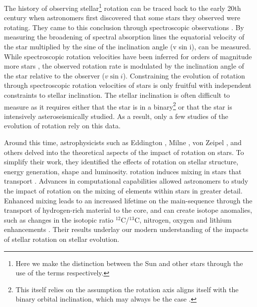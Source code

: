 The history of observing stellar\footnote{Here we make the distinction between the Sun and other stars through the use of the terms  respectively.} rotation can be traced back to the early 20th century when astronomers first discovered that some stars they observed were rotating. 
They came to this conclusion through spectroscopic observations \citep{elvey_contours_1929, struve_stellar_1930, struve_axial_1930}.
By measuring the broadening of spectral absorption lines the equatorial velocity of the star multiplied by the sine of the inclination angle (v sin i), can be measured.
While spectroscopic rotation velocities have been inferred for orders of magnitude more stars , the observed rotation rate is modulated by the  inclination angle of the star relative to the observer ($v\sin{i}$).
Constraining the evolution of rotation through spectroscopic rotation velocities of stars is only fruitful with independent constraints to stellar inclination.
The stellar inclination is often difficult to measure as it requires either that the star is in a binary\footnote{This itself relies on the assumption the rotation axis aligns itself with the binary orbital inclination, which may always be the case \citet{albrecht_banana_2011,albrecht_banana_2013}.} or that the star is intensively asteroseismically studied.
As a result, only a few studies of the evolution of rotation rely on this data.

Around this time, astrophysicists such as Eddington \citep{eddington_conditions_1918,eddington_internal_1926,eddington_internal_1929}, Milne \citep{milne_equilibrium_1923}, von Zeipel \citep{von_zeipel_radiative_1924}, and others delved into the theoretical aspects of the impact of rotation on stars.
To simplify their work, they identified the effects of rotation on stellar structure, energy generation, shape and luminosity. 
 rotation induces mixing in stars that  transport .
Advances in computational capabilities allowed astronomers to study the impact of rotation on the mixing of elements within stars in greater detail. 
Enhanced mixing leads to an increased lifetime on the main-sequence through the transport of hydrogen-rich material to the core, and can create isotope anomalies, such as changes in the isotopic ratio $^{12}$C/$^{13}$C, nitrogen, oxygen and lithium enhancements \citep{maeder_evolution_2000,heger_presupernova_2000,charbonnel_lithium_1994}.
Their results underlay our modern understanding of the impacts of stellar rotation on stellar evolution.

